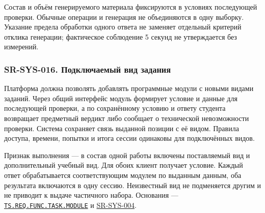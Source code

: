 \documentclass[12pt,a4paper]{article}
\begin{document}
Состав и объём генерируемого материала фиксируются в условиях последующей проверки. Обычные операции и генерация не объединяются в одну выборку. Указание предела обработки одного ответа не заменяет отдельный критерий отклика генерации; фактическое соблюдение 5 секунд не утверждается без измерений.

\subsubsection{SR-SYS-016. Подключаемый вид задания}\label{sr-sys-016-ux43fux43eux434ux43aux43bux44eux447ux430ux435ux43cux44bux439-ux432ux438ux434-ux437ux430ux434ux430ux43dux438ux44f}

\hypertarget{sr-sys-016-подключаемый-вид-задания}{}

\hypertarget{sr-sys-016}{}

Платформа должна позволять добавлять программные модули с новыми видами заданий. Через общий интерфейс модуль формирует условие и данные для последующей проверки, а по сохранённому условию и ответу студента возвращает предметный вердикт либо сообщает о технической невозможности проверки. Система сохраняет связь выданной позиции с её видом. Правила доступа, времени, попытки и итога сессии одинаковы для подключённых видов.

Признак выполнения --- в состав одной работы включены поставляемый вид и дополнительный учебный вид. Для обоих клиент получает условие. Каждый ответ обрабатывается соответствующим модулем по выданным данным, оба результата включаются в одну сессию. Неизвестный вид не подменяется другим и не приводит к выдаче частичного набора. Основания --- {\href{../02\_Техническое\_задание/Техническое\_задание.pdf\#ts-req-func-task-module}{\texttt{TS.\allowbreak{}REQ.\allowbreak{}FUNC.\allowbreak{}TASK.\allowbreak{}MODULE}}} и {\hyperlink{sr-sys-004}{SR-SYS-004}}.
\end{document}
